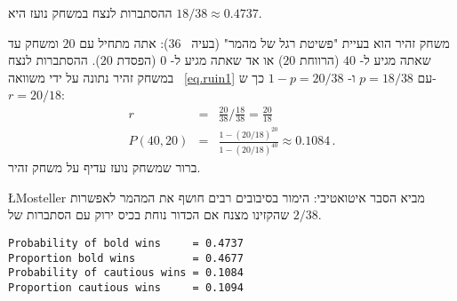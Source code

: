 \solution{}

ההסתברות לנצח במשחק נועז היא
$18/38\approx 0.4737$.

משחק זהיר הוא בעיית "פשיטת רגל של מהמר" (בעיה%
~$36$):
אתה מתחיל עם 
$20$
ומשחק עד שאתה מגיע ל-%
$40$
(הרווחת 
$20$)
או אד שאתה מגיע ל-%
$0$
(הפסדת
$20$).
ההסתברות לנצח במשחק זהיר נתונה על ידי משוואה%
~\ref{eq.ruin1}
עם
$p=18/38$
ו-%
$1-p=20/38$
כך ש-%
$r=20/18$:
\begin{eqnarray*}
r&=&\frac{20}{38}\Big /\frac{18}{38}=\frac{20}{18}\\
P(40,20) &=&
\frac{1-(20/18)^{20}}{1-(20/18)^{40}}\approx 0.1084\,.
\end{eqnarray*}
ברור שמשחק נועז עדיף על משחק זהיר.

\L{Mosteller}
מביא הסבר איטואטיבי: הימור בסיבובים רבים חושף את המהמר לאפשרות שהקזינו מצנח אם הכדור נוחת בכיס ירוק עם הסתברות של
$2/38$.

\sml{}
\begin{verbatim}
Probability of bold wins     = 0.4737
Proportion bold wins         = 0.4677
Probability of cautious wins = 0.1084
Proportion cautious wins     = 0.1094
\end{verbatim}




